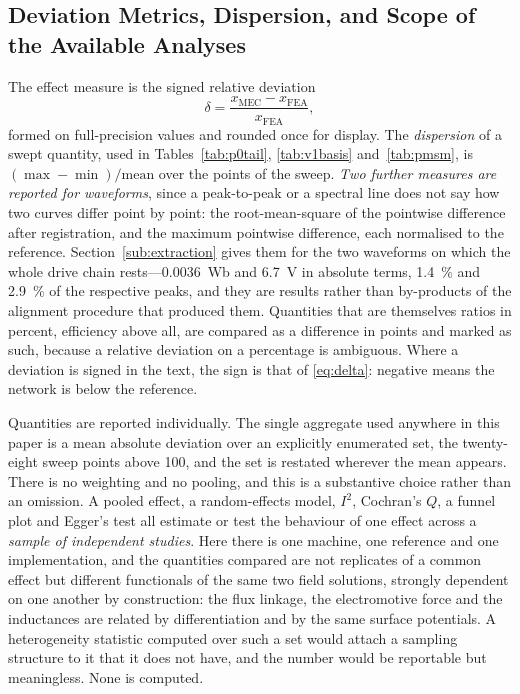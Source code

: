 \documentclass[10pt,a4paper,twocolumn]{article}
\theoremstyle{plain}
\theoremstyle{remark}
\begin{document}
\subsection{Deviation Metrics, Dispersion, and Scope of the Available Analyses}
\label{sub:stats}

The effect measure is the signed relative deviation
\begin{equation}
\delta = \frac{x_{\mathrm{MEC}}-x_{\mathrm{FEA}}}{x_{\mathrm{FEA}}},
\label{eq:delta}
\end{equation}
formed on full-precision values and rounded once for display. The
\emph{dispersion} of a swept quantity, used in Tables~\ref{tab:p0tail},
\ref{tab:v1basis} and~\ref{tab:pmsm}, is $(\max-\min)/\mathrm{mean}$
over the points of the sweep.
\emph{Two further measures are reported for waveforms}, since a
peak-to-peak or a spectral line does not say how two curves differ point
by point: the root-mean-square of the pointwise difference after
registration, and the maximum pointwise difference, each normalised to
the reference. Section~\ref{sub:extraction} gives them for the two
waveforms on which the whole drive chain rests---\SI{0.0036}{\weber} and
\SI{6.7}{\volt} in absolute terms, \SI{1.4}{\percent} and
\SI{2.9}{\percent} of the respective peaks, and they are results rather
than by-products of the alignment procedure that produced them.
Quantities
that are themselves ratios in percent, efficiency above all, are
compared as a difference in points and marked as such, because a
relative deviation on a percentage is ambiguous. Where a deviation is
signed in the text, the sign is that of \eqref{eq:delta}: negative means
the network is below the reference.

Quantities are reported individually. The single aggregate used anywhere
in this paper is a mean absolute deviation over an explicitly enumerated
set, the twenty-eight sweep points above \SI{100}{\rpm}, and the set is
restated wherever the mean appears. There is no weighting and no
pooling, and this is a substantive choice rather than an omission. A
pooled effect, a random-effects model, $I^{2}$, Cochran's $Q$, a funnel
plot and Egger's test all estimate or test the behaviour of one effect
across a \emph{sample of independent studies}. Here there is one
machine, one reference and one implementation, and the quantities
compared are not replicates of a common effect but different functionals
of the same two field solutions, strongly dependent on one another by
construction: the flux linkage, the electromotive force and the
inductances are related by differentiation and by the same surface
potentials. A heterogeneity statistic computed over such a set would
attach a sampling structure to it that it does not have, and the number
would be reportable but meaningless. None is computed.
\end{document}

